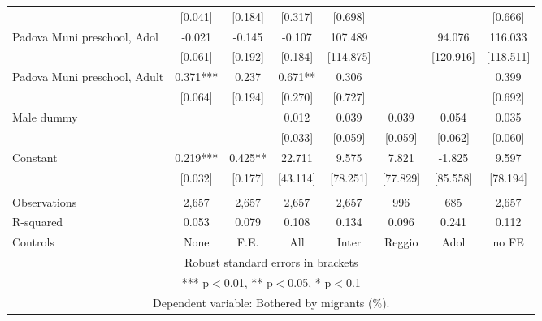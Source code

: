 \begin{tabular}{lccccccc}
 & [0.041] & [0.184] & [0.317] & [0.698] &  &  & [0.666] \\
Padova Muni preschool, Adol & -0.021 & -0.145 & -0.107 & 107.489 &  & 94.076 & 116.033 \\
 & [0.061] & [0.192] & [0.184] & [114.875] &  & [120.916] & [118.511] \\
Padova Muni preschool, Adult & 0.371*** & 0.237 & 0.671** & 0.306 &  &  & 0.399 \\
 & [0.064] & [0.194] & [0.270] & [0.727] &  &  & [0.692] \\
Male dummy &  &  & 0.012 & 0.039 & 0.039 & 0.054 & 0.035 \\
 &  &  & [0.033] & [0.059] & [0.059] & [0.062] & [0.060] \\
Constant & 0.219*** & 0.425** & 22.711 & 9.575 & 7.821 & -1.825 & 9.597 \\
 & [0.032] & [0.177] & [43.114] & [78.251] & [77.829] & [85.558] & [78.194] \\
 &  &  &  &  &  &  &  \\
Observations & 2,657 & 2,657 & 2,657 & 2,657 & 996 & 685 & 2,657 \\
R-squared & 0.053 & 0.079 & 0.108 & 0.134 & 0.096 & 0.241 & 0.112 \\
 Controls & None & F.E. & All & Inter & Reggio & Adol & no FE \\ \hline
\multicolumn{8}{c}{ Robust standard errors in brackets} \\
\multicolumn{8}{c}{ *** p$<$0.01, ** p$<$0.05, * p$<$0.1} \\
\multicolumn{8}{c}{ Dependent variable: Bothered by migrants (\%).} \\
\end{tabular}
